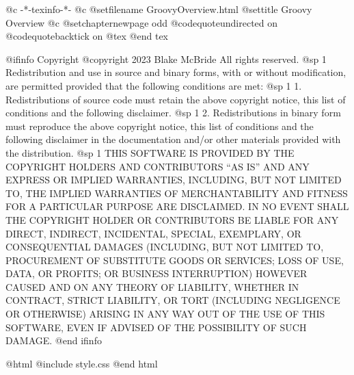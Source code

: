     @c -*-texinfo-*-
@c %
@setfilename GroovyOverview.html
@settitle Groovy Overview
@c %
@setchapternewpage odd
@codequoteundirected on
@codequotebacktick on
@tex
\global\def\linkcolor{0 0 1}  %
\global\def\urlcolor{0 0 1}   %
@end tex

@ifinfo
Copyright  @copyright{} 2023 Blake McBride
All rights reserved.
@sp 1
Redistribution and use in source and binary forms, with or without
modification, are permitted provided that the following conditions are
met:
@sp 1
1. Redistributions of source code must retain the above copyright
notice, this list of conditions and the following disclaimer.
@sp 1
2. Redistributions in binary form must reproduce the above copyright
notice, this list of conditions and the following disclaimer in the
documentation and/or other materials provided with the distribution.
@sp 1
THIS SOFTWARE IS PROVIDED BY THE COPYRIGHT HOLDERS AND CONTRIBUTORS
``AS IS'' AND ANY EXPRESS OR IMPLIED WARRANTIES, INCLUDING, BUT NOT
LIMITED TO, THE IMPLIED WARRANTIES OF MERCHANTABILITY AND FITNESS FOR
A PARTICULAR PURPOSE ARE DISCLAIMED. IN NO EVENT SHALL THE COPYRIGHT
HOLDER OR CONTRIBUTORS BE LIABLE FOR ANY DIRECT, INDIRECT, INCIDENTAL,
SPECIAL, EXEMPLARY, OR CONSEQUENTIAL DAMAGES (INCLUDING, BUT NOT
LIMITED TO, PROCUREMENT OF SUBSTITUTE GOODS OR SERVICES; LOSS OF USE,
DATA, OR PROFITS; OR BUSINESS INTERRUPTION) HOWEVER CAUSED AND ON ANY
THEORY OF LIABILITY, WHETHER IN CONTRACT, STRICT LIABILITY, OR TORT
(INCLUDING NEGLIGENCE OR OTHERWISE) ARISING IN ANY WAY OUT OF THE USE
OF THIS SOFTWARE, EVEN IF ADVISED OF THE POSSIBILITY OF SUCH DAMAGE.
@end ifinfo

@html
@include style.css
@end html


